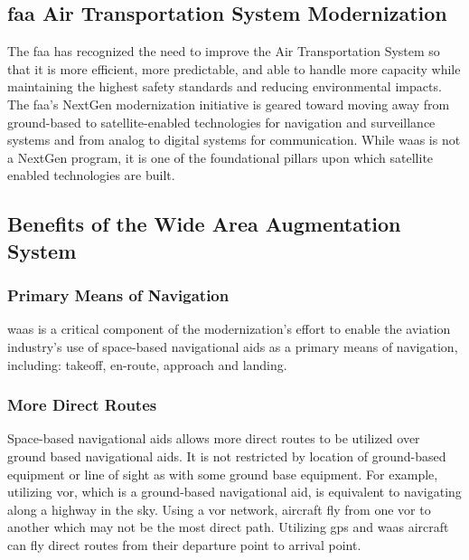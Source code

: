 \subsection{\ac{faa} Air Transportation System
Modernization}\label{faa-air-transportation-system-modernization}

The \ac{faa} has recognized the need to improve the Air Transportation System
so that it is more efficient, more predictable, and able to handle more
capacity while maintaining the highest safety standards and reducing
environmental impacts. The \ac{faa}'s NextGen modernization initiative is
geared toward moving away from ground-based to satellite-enabled
technologies for navigation and surveillance systems and from analog to
digital systems for communication. While \ac{waas} is not a NextGen program,
it is one of the foundational pillars upon which satellite enabled
technologies are built.

\subsection{Benefits of the Wide Area Augmentation
System}\label{benefits-of-the-wide-area-augmentation-system}

\subsubsection{Primary Means of
Navigation}\label{primary-means-of-navigation}

\ac{waas} is a critical component of the modernization's effort to enable the
aviation industry's use of space-based navigational aids as a primary
means of navigation, including: takeoff, en-route, approach and landing.

\subsubsection{More Direct Routes}\label{more-direct-routes}

Space-based navigational aids allows more direct routes to be utilized
over ground based navigational aids. It is not restricted by location of
ground-based equipment or line of sight as with some ground base
equipment. For example, utilizing \ac{vor}, which is a ground-based
navigational aid, is equivalent to navigating along a highway in the
sky. Using a \ac{vor} network, aircraft fly from one \ac{vor} to another which may
not be the most direct path. Utilizing \ac{gps} and \ac{waas} aircraft can fly
direct routes from their departure point to arrival point.


